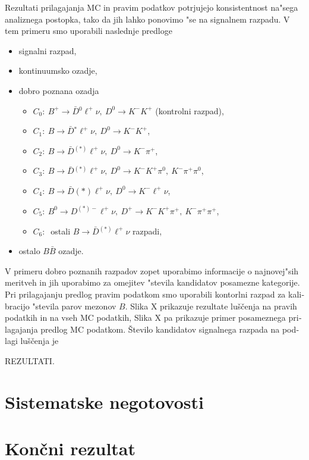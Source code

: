 \begin{otherlanguage}{slovene}
Rezultati prilagajanja MC in pravim podatkov potrjujejo konsistentnost na"sega analiznega postopka, tako da jih lahko ponovimo "se na signalnem razpadu. V tem primeru smo uporabili naslednje predloge
\begin{itemize}
	\item signalni razpad,
	\item kontinuumsko ozadje,
	\item dobro poznana ozadja
	\begin{itemize}
		\item $C_0:~B^+ \to \bar{D} {}^0 \ell^+ \nu,~D^0 \to K^-K^+$ (kontrolni razpad),
		\item $C_1:~B \to \bar{D} {}^* \ell^+ \nu,~D^0 \to K^-K^+$,
		\item $C_2:~B \to \bar{D} {}^{(*)} \ell^+ \nu,~D^0 \to K^-\pi^+$,
		\item $C_3:~B \to \bar{D} {}^{(*)} \ell^+ \nu,~D^0 \to K^-K^+\pi^0,~K^-\pi^+\pi^0$,
		\item $C_4:~B \to \bar{D} {}{(*)} \ell^+ \nu,~D^0 \to K^-\ell^+\nu$,
		\item $C_5:~B^0 \to D^{(*)-} \ell^+ \nu,~D^+ \to K^-K^+\pi^+,~K^-\pi^+\pi^+$,
		\item $C_6:~$ ostali $B \to \bar D {}^{(*)} \ell^+ \nu$ razpadi,
	\end{itemize}
	\item ostalo $B \bar B$ ozadje.
\end{itemize}
V primeru dobro poznanih razpadov zopet uporabimo informacije o najnovej"sih meritveh in jih uporabimo za omejitev "stevila kandidatov posamezne kategorije. Pri prilagajanju predlog pravim podatkom smo uporabili kontorlni razpad za kalibracijo "stevila parov mezonov $B$. Slika X prikazuje rezultate luščenja na pravih podatkih in na vseh MC podatkih, Slika X pa prikazuje primer posameznega prilagajanja predlog MC podatkom. Število kandidatov signalnega razpada na podlagi luščenja je

REZULTATI.

\section{Sistematske negotovosti}

\section{Kon\v cni rezultat}

\end{otherlanguage}
